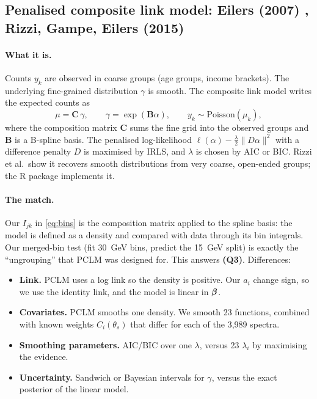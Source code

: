 \subsection{Penalised composite link model: Eilers (2007) \cite{Eilers2007}, Rizzi, Gampe,
Eilers (2015) \cite{Rizzi2015}}

\paragraph{What it is.} Counts $y_k$ are observed in coarse groups (age groups, income
brackets). The underlying fine-grained distribution $\gamma$ is smooth. The composite link
model writes the expected counts as
\begin{equation}
\mu = \mathbf{C}\,\gamma, \qquad \gamma = \exp(\mathbf{B}\alpha), \qquad
y_k \sim \mathrm{Poisson}(\mu_k),
\end{equation}
where the composition matrix $\mathbf{C}$ sums the fine grid into the observed groups and
$\mathbf{B}$ is a B-spline basis. The penalised log-likelihood
$\ell(\alpha) - \tfrac{\lambda}{2}\lVert D\alpha\rVert^2$ with a difference penalty $D$ is
maximised by IRLS, and $\lambda$ is chosen by AIC or BIC. Rizzi et al.\ show it recovers
smooth distributions from very coarse, open-ended groups; the R package 
implements it.

\paragraph{The match.} Our $I_{jk}$ in \cref{eq:bins} is the composition matrix applied to the
spline basis: the model is defined as a density and compared with data through its bin
integrals. Our merged-bin test (fit 30~GeV bins, predict the 15~GeV split) is exactly the
``ungrouping'' that PCLM was designed for. This answers \textbf{(Q3)}. Differences:
\begin{itemize}
  \item \textbf{Link.} PCLM uses a log link so the density is positive. Our $a_i$ change sign,
    so we use the identity link, and the model is linear in $\boldsymbol{\beta}$.
  \item \textbf{Covariates.} PCLM smooths one density. We smooth 23 functions, combined with
    known weights $C_i(\theta_s)$ that differ for each of the 3,989 spectra.
  \item \textbf{Smoothing parameters.} AIC/BIC over one $\lambda$, versus 23 $\lambda_i$ by
    maximising the evidence.
  \item \textbf{Uncertainty.} Sandwich or Bayesian intervals for $\gamma$, versus the exact
    posterior of the linear model.
\end{itemize}

